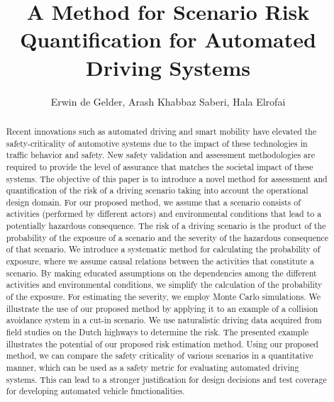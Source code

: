 \documentclass[letterpaper, 10 pt, conference]{ieeeconf}  %
\title{\LARGE \bf
A Method for Scenario Risk Quantification for Automated Driving Systems
}
\author{Erwin de Gelder, Arash Khabbaz Saberi, Hala Elrofai}
\begin{document}
\maketitle
\thispagestyle{empty}
\pagestyle{empty}


\begin{abstract}
Recent innovations such as automated driving and smart mobility have elevated the safety-criticality of automotive systems due to the impact of these technologies in traffic behavior and safety. New safety validation and assessment methodologies are required to provide the level of assurance that matches the societal impact of these systems.
The objective of this paper is to introduce a novel method for assessment and quantification of the risk of a driving scenario taking into account the operational design domain. 
For our proposed method, we assume that a scenario consists of activities (performed by different actors) and environmental conditions that lead to a potentially hazardous consequence.
The risk of a driving scenario is the product of the probability of the exposure of a scenario and the severity of the hazardous consequence of that scenario.
We introduce a systematic method for calculating the probability of exposure, 
where we assume causal relations between the activities that constitute a scenario. 
By making educated assumptions on the dependencies among the different activities and environmental conditions, 
we simplify the calculation of the probability of the exposure. 
For estimating the severity, we employ Monte Carlo simulations.
We illustrate the use of our proposed method by applying it to an example of a collision avoidance system in a cut-in scenario. 
We use naturalistic driving data acquired from field studies on the Dutch highways to determine the risk. 
The presented example illustrates the potential of our proposed risk estimation method. 
Using our proposed method, we can compare the safety criticality of various scenarios in a quantitative manner, which can be used as a safety metric for evaluating automated driving systems. 
This can lead to a stronger justification for design decisions and test coverage for developing automated vehicle functionalities. 
\end{abstract}




%
%




\end{document}

